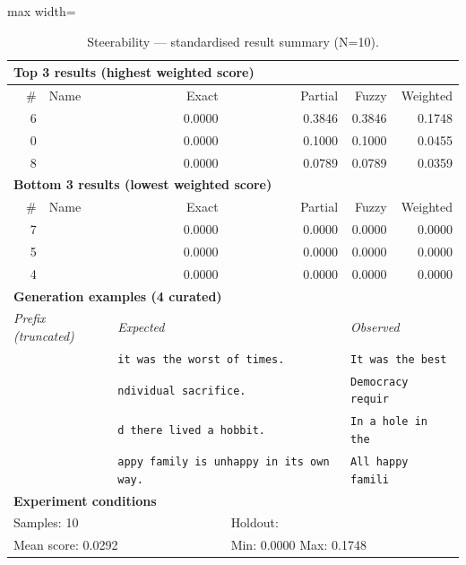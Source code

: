 \begin{table}[htbp]
\centering
\caption{Steerability — standardised result summary (N=10).}
\label{tab:steerability_summary}
\begin{adjustbox}{max width=\textwidth}
\begin{tabular}{r p{5cm} r r r r}
\toprule
\multicolumn{6}{l}{\textbf{Top 3 results (highest weighted score)}} \\
\midrule
\# & Name & Exact & Partial & Fuzzy & Weighted \\
\midrule
6 &  & 0.0000 & 0.3846 & 0.3846 & 0.1748 \\
0 &  & 0.0000 & 0.1000 & 0.1000 & 0.0455 \\
8 &  & 0.0000 & 0.0789 & 0.0789 & 0.0359 \\
\midrule
\multicolumn{6}{l}{\textbf{Bottom 3 results (lowest weighted score)}} \\
\midrule
\# & Name & Exact & Partial & Fuzzy & Weighted \\
\midrule
7 &  & 0.0000 & 0.0000 & 0.0000 & 0.0000 \\
5 &  & 0.0000 & 0.0000 & 0.0000 & 0.0000 \\
4 &  & 0.0000 & 0.0000 & 0.0000 & 0.0000 \\
\midrule
\multicolumn{6}{l}{\textbf{Generation examples (4 curated)}} \\
\midrule
\multicolumn{2}{l}{\textit{Prefix (truncated)}} & \multicolumn{2}{l}{\textit{Expected}} & \multicolumn{2}{l}{\textit{Observed}} \\
\midrule
\multicolumn{2}{l}{\texttt{}} & \multicolumn{2}{l}{\texttt{it was the worst of times.}} & \multicolumn{2}{l}{\texttt{It was the best}} \\
\multicolumn{2}{l}{\texttt{}} & \multicolumn{2}{l}{\texttt{ndividual sacrifice.}} & \multicolumn{2}{l}{\texttt{Democracy requir}} \\
\multicolumn{2}{l}{\texttt{}} & \multicolumn{2}{l}{\texttt{d there lived a hobbit.}} & \multicolumn{2}{l}{\texttt{In a hole in the}} \\
\multicolumn{2}{l}{\texttt{}} & \multicolumn{2}{l}{\texttt{appy family is unhappy in its own way.}} & \multicolumn{2}{l}{\texttt{All happy famili}} \\
\midrule
\multicolumn{6}{l}{\textbf{Experiment conditions}} \\
\midrule
\multicolumn{3}{l}{Samples: 10} & \multicolumn{3}{l}{Holdout: } \\
\multicolumn{3}{l}{Mean score: 0.0292} & \multicolumn{3}{l}{Min: 0.0000 \quad Max: 0.1748} \\

\end{tabular}
\end{adjustbox}
\end{table}

